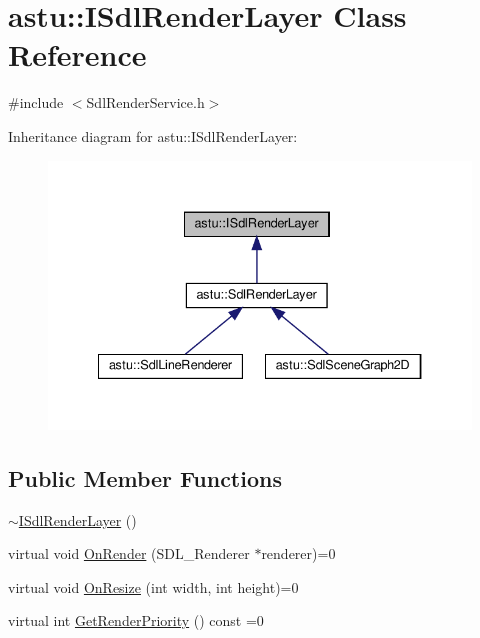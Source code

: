 \hypertarget{classastu_1_1ISdlRenderLayer}{}\section{astu\+:\+:I\+Sdl\+Render\+Layer Class Reference}
\label{classastu_1_1ISdlRenderLayer}


{\ttfamily \#include $<$Sdl\+Render\+Service.\+h$>$}



Inheritance diagram for astu\+:\+:I\+Sdl\+Render\+Layer\+:\nopagebreak
\begin{figure}[H]
\begin{center}
\leavevmode
\includegraphics[width=334pt]{classastu_1_1ISdlRenderLayer__inherit__graph}
\end{center}
\end{figure}
\subsection*{Public Member Functions}
\begin{DoxyCompactItemize}
\item 
\hyperlink{classastu_1_1ISdlRenderLayer_af507055c193d430822d5aadb6cbaf6a9}{$\sim$\+I\+Sdl\+Render\+Layer} ()
\item 
virtual void \hyperlink{classastu_1_1ISdlRenderLayer_a18af53e17e7f6f945817ad3e8b8ecc87}{On\+Render} (S\+D\+L\+\_\+\+Renderer $\ast$renderer)=0
\item 
virtual void \hyperlink{classastu_1_1ISdlRenderLayer_abcded808a2405e1e59413b5d1f981f13}{On\+Resize} (int width, int height)=0
\item 
virtual int \hyperlink{classastu_1_1ISdlRenderLayer_a623b411a1afa967bdaa879f5075eec43}{Get\+Render\+Priority} () const =0
\end{DoxyCompactItemize}


